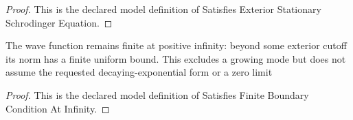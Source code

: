 \begin{proof}
  This is the declared model definition of Satisfies Exterior Stationary Schrodinger Equation.
\end{proof}
\begin{definition}
  \label{def:physics:phyx-mini-0521:phyxminiproblems-problemphyxmini0521-satisfiesfiniteboundaryconditionatinfinity}
  The wave function remains finite at positive infinity: beyond some exterior cutoff its norm has a finite uniform bound. This excludes a growing mode but does not assume the requested decaying-exponential form or a zero limit
\end{definition}
\begin{proof}
  This is the declared model definition of Satisfies Finite Boundary Condition At Infinity.
\end{proof}
